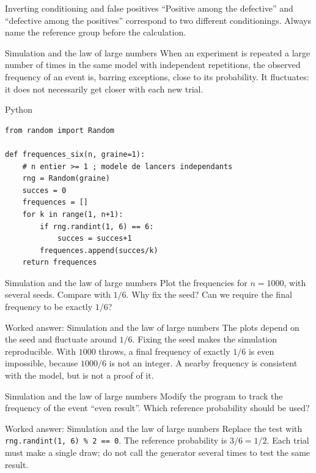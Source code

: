 \documentclass[aspectratio=169,10pt]{beamer}
\begin{document}
\begin{frame}{Inverting conditioning and false positives}
“Positive among the defective” and “defective among the positives” correspond to two different conditionings. Always name the reference group before the calculation.
\end{frame}
\begin{frame}{Simulation and the law of large numbers}
When an experiment is repeated a large number of times in the same model with independent repetitions, the observed frequency of an event is, barring exceptions, close to its probability. It fluctuates: it does not necessarily get closer with each new trial.
\end{frame}
\begin{frame}[fragile]{Python}
\small
\begin{verbatim}
from random import Random

def frequences_six(n, graine=1):
    # n entier >= 1 ; modele de lancers independants
    rng = Random(graine)
    succes = 0
    frequences = []
    for k in range(1, n+1):
        if rng.randint(1, 6) == 6:
            succes = succes+1
        frequences.append(succes/k)
    return frequences
\end{verbatim}
\end{frame}
\begin{frame}{Simulation and the law of large numbers}
Plot the frequencies for \(n=1000\), with several seeds. Compare with \(1/6\). Why fix the seed? Can we require the final frequency to be exactly \(1/6\)?
\end{frame}
\begin{frame}{Worked answer: Simulation and the law of large numbers}
The plots depend on the seed and fluctuate around \(1/6\). Fixing the seed makes the simulation reproducible. With \(1000\) throws, a final frequency of exactly \(1/6\) is even impossible, because \(1000/6\) is not an integer. A nearby frequency is consistent with the model, but is not a proof of it.
\end{frame}
\begin{frame}{Simulation and the law of large numbers}
Modify the program to track the frequency of the event “even result”. Which reference probability should be used?
\end{frame}
\begin{frame}{Worked answer: Simulation and the law of large numbers}
Replace the test with \texttt{rng.randint(1, 6) \% 2 == 0}. The reference probability is \(3/6=1/2\). Each trial must make a single draw; do not call the generator several times to test the same result.
\end{frame}
\end{document}
